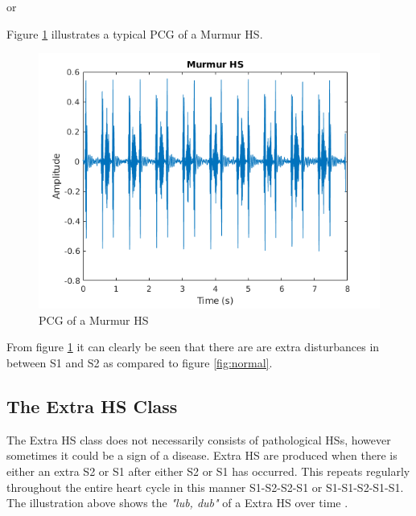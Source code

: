 \documentclass[10pt,twocolumn]{witseiepaper}
\begin{document}

\hspace{3.5cm} or 


Figure \ref{fig:murmur} illustrates a typical PCG of a Murmur HS.
\begin{figure}[h!]
    \centering
    \includegraphics[scale = 0.45]{./murmur.png}
    \caption{PCG of a Murmur HS}
    \label{fig:murmur}
\end{figure}{}

From figure \ref{fig:murmur} it can clearly be seen that there are are extra disturbances in between S1 and S2 as compared to figure \ref{fig:normal}.

\subsection*{The Extra HS Class}
\label{sec:extra}
The Extra HS class does not necessarily consists of pathological HSs, however sometimes it could be a sign of a disease. Extra HS are produced when there is either an extra S2 or S1 after either S2 or S1 has occurred. This repeats regularly throughout the entire heart cycle in this manner S1-S2-S2-S1 or S1-S1-S2-S1-S1.
The illustration above shows the \textit{"lub, dub"} of a Extra HS over time \cite{bentley}.

\end{document}
